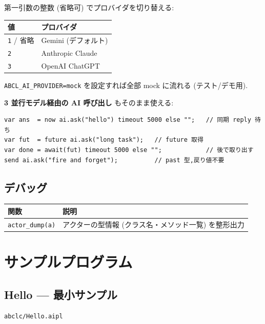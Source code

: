 \documentclass[11pt,a4paper]{article}
\begin{document}
第一引数の整数 (省略可) でプロバイダを切り替える:

\begin{center}
\begin{tabular}{ll}
\toprule
値 & プロバイダ \\
\midrule
\texttt{1} / 省略 & Gemini (デフォルト) \\
\texttt{2} & Anthropic Claude \\
\texttt{3} & OpenAI ChatGPT \\
\bottomrule
\end{tabular}
\end{center}

\texttt{ABCL\_AI\_PROVIDER=mock} を設定すれば全部 mock に流れる (テスト/デモ用).

\textbf{3 並行モデル経由の AI 呼び出し} もそのまま使える:

\begin{lstlisting}
var ans  = now ai.ask("hello") timeout 5000 else "";   // 同期 reply 待ち
var fut  = future ai.ask("long task");   // future 取得
var done = await(fut) timeout 5000 else "";            // 後で取り出す
send ai.ask("fire and forget");          // past 型,戻り値不要
\end{lstlisting}

\subsection{デバッグ}

\begin{center}
\begin{tabular}{ll}
\toprule
関数 & 説明 \\
\midrule
\texttt{actor\_dump(a)} & アクターの型情報 (クラス名・メソッド一覧) を整形出力 \\
\bottomrule
\end{tabular}
\end{center}

\section{サンプルプログラム}

\subsection{Hello --- 最小サンプル}

\texttt{abclc/Hello.aipl}
\end{document}

